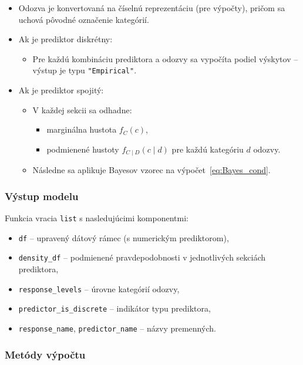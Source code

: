 \begin{itemize}
\setlength{\itemsep}{0pt}
  \setlength{\parskip}{0pt}
  \item Odozva je konvertovaná na číselnú reprezentáciu (pre výpočty), pričom sa uchová pôvodné označenie kategórií.
  \item Ak je prediktor diskrétny:
  \begin{itemize}
    \item Pre každú kombináciu prediktora a odozvy sa vypočíta podiel výskytov – výstup je typu \texttt{"}\texttt{Empirical"}.
  \end{itemize}
  \item Ak je prediktor spojitý:
  \begin{itemize}
    \item V každej sekcii sa odhadne:
    \begin{itemize}
      \item marginálna hustota $f_C(c)$,
      \item podmienené hustoty $f_{C \mid D}(c \mid d)$ pre každú kategóriu $d$ odozvy.
    \end{itemize}
    \item Následne sa aplikuje Bayesov vzorec na výpočet~\ref{eq:Bayes_cond}.
  \end{itemize}
\end{itemize}

\subsubsection{Výstup modelu}

Funkcia vracia \texttt{list} s nasledujúcimi komponentmi:

\begin{itemize}
\setlength{\itemsep}{0pt}
  \setlength{\parskip}{0pt}
  \item \texttt{df} – upravený dátový rámec (s numerickým prediktorom),
  \item \texttt{density\_df} – podmienené pravdepodobnosti v jednotlivých sekciách prediktora,
  \item \texttt{response\_levels} – úrovne kategórií odozvy,
  \item \texttt{predictor\_is\_discrete} – indikátor typu prediktora,
  \item \texttt{response\_name}, \texttt{predictor\_name} – názvy premenných.
\end{itemize}

\subsubsection{Metódy výpočtu}

